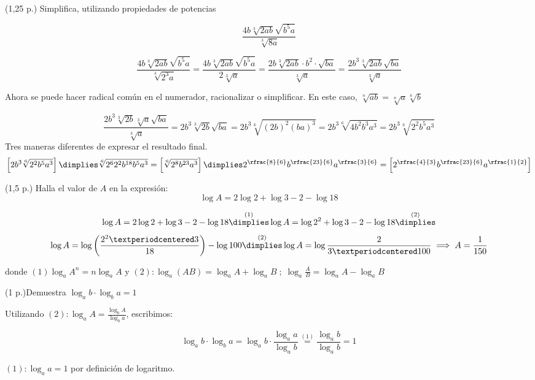 \documentclass[palatino,nosec]{Docencia}
\begin{document}
\begin{problem}(1,25 p.) Simplifica, utilizando propiedades de potencias

\[
\frac{4b\sqrt[3]{2ab}\sqrt{b^5a}}{\sqrt[3]{8a}}
\]

\solution

\[
\frac{4b\sqrt[3]{2ab}\sqrt{b^5a}}{\sqrt[3]{2^3a}} = \frac{4b\sqrt[3]{2ab}\sqrt{b^5a}}{2\sqrt[3]{a}} = \frac{2b\sqrt[3]{2ab}·b^2·\sqrt{ba}}{\sqrt[3]{a}} = \frac{2b^3\sqrt[3]{2ab}\sqrt{ba}}{\sqrt[3]{a}}
\]

Ahora se puede hacer radical común en el numerador, racionalizar o simplificar. En este caso, $\sqrt[n]{ab} = \sqrt[n]{a}\sqrt[n]{b}$

\[
\frac{2b^3\sqrt[3]{2b}\sqrt[3]{a}\sqrt{ba}}{\sqrt[3]{a}} = 2b^3\sqrt[3]{2b}\sqrt{ba} = 2b^3\sqrt[6]{(2b)^2(ba)^3} = 2b^3\sqrt[6]{4b^2b^3a^3} = 2b^3\sqrt[6]{2^2b^5a^3}
\]
Tres maneras diferentes de expresar el resultado final.
\[
	\left[2b^3\sqrt[6]{2^2b^5a^3}\right] \dimplies \sqrt[6]{2^62^2b^{18}b^5a^3} = \left[\sqrt[6]{2^8b^{23}a^3}\right] \dimplies 2^{\rfrac{8}{6}}b^{\rfrac{23}{6}}a^{\rfrac{3}{6}} = \left[2^{\rfrac{4}{3}}b^{\rfrac{23}{6}}a^{\rfrac{1}{2}}\right]
\]


\end{problem}

\begin{problem}(1,5 p.) Halla el valor de $A$ en la expresión:
\[
	\log A = 2\log 2 + \log3 - 2 - \log 18
\]

\solution

\[
	\log A = 2\log 2 + \log3 - 2 - \log 18 \overset{(1)}{\dimplies} \log A = \log 2^2 + \log3 - 2 - \log 18 \overset{(2)}{\dimplies}
\]
\[ 
	\log A = \log\left(\frac{2^2·3}{18}\right) - \log 100 \overset{(2)}{\dimplies} \log A = \log\frac{2}{3·100} \implies A=\frac{1}{150}
\]

donde $(1) \log_aA^n = n\log_aA$ y $(2): \log_a(AB) = \log_aA + \log_aB\;;\;\log_a\frac{A}{B} = \log_aA - \log_aB$

\end{problem}

\begin{problem}(1 p.)Demuestra $\log_ab·\log_ba = 1$

\solution

Utilizando $(2): \log_aA = \frac{\log_bA}{\log_ba} $, escribimos:

\[
\log_ab·\log_ba = \log_ab ·\frac{\log_aa}{\log_ab} \overset{(1)}{=}  \frac{\log_ab}{\log_ab} = 1
\]

$(1): \log_aa=1$ por definición de logaritmo.
\end{problem}
\end{document}
